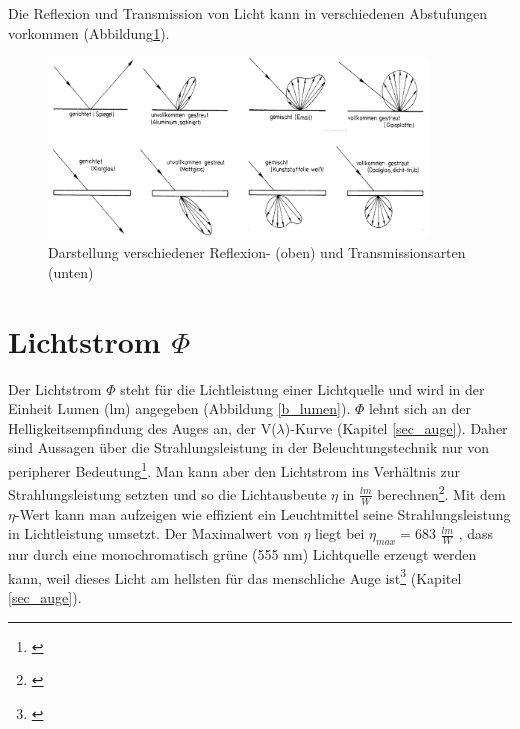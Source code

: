 Die Reflexion und Transmission von Licht kann in verschiedenen Abstufungen vorkommen (Abbildung\ref{b_reftrans}).

\begin{figure}[H]     %
\centering
\includegraphics[width=0.9\textwidth]{bilder/reftrans} 
\caption {Darstellung verschiedener Reflexion- (oben) und Transmissionsarten (unten) \protect\footnotemark}\label{b_reftrans}
\end{figure}


\section{Lichtstrom $\Phi$} \label{sec_lumen}
Der Lichtstrom $\Phi$ steht für die Lichtleistung einer Lichtquelle und wird in der Einheit Lumen (lm) angegeben (Abbildung \ref{b_lumen}). $\Phi$ lehnt sich an der Helligkeitsempfindung des Auges an, der V($\lambda$)-Kurve (Kapitel \ref{sec_auge}). Daher sind Aussagen über die Strahlungsleistung in der Beleuchtungstechnik nur von peripherer Bedeutung\footnote{\cite[23]{ris}}. Man kann aber den Lichtstrom ins Verhältnis zur Strahlungsleistung setzten und so die Lichtausbeute $\eta$ in $\frac{lm}{W}$ berechnen\footnote{\cite[35]{greule}}. Mit dem $\eta$-Wert kann man aufzeigen wie effizient ein Leuchtmittel seine Strahlungsleistung in Lichtleistung umsetzt. Der Maximalwert von $\eta$ liegt bei $\eta_{max}=683$ $\frac{lm}{W}$ , dass nur durch eine monochromatisch grüne (555 nm) Lichtquelle erzeugt werden kann, weil dieses Licht am hellsten für das menschliche Auge ist\footnote{\cite[36]{greule}} (Kapitel \ref{sec_auge}).

